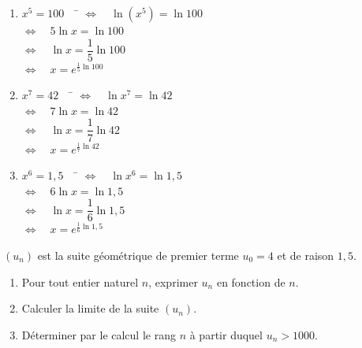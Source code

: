 \documentclass[a4paper,11pt,exos]{nsi} %
\begin{document}
\textcolor{UGLiBlue}{
    \begin{multicols}{2}
        \begin{enumerate}
            \item \begin{tabbing}
                $x^5=100\quad$ \= $\iff \quad \ln\left(x^5\right)=\ln 100$\\
                \> $\iff \quad 5\ln x=\ln 100$\\
                \> $\iff \quad \ln x=\dfrac{1}{5}\ln 100$\\[.5em]
                \> $\iff \quad x=e^{\frac{1}{5}\ln 100}$
            \end{tabbing}
            \item \begin{tabbing}
                $x^7=42\quad$ \= $\iff \quad \ln x^7=\ln 42$\\
                \> $\iff \quad 7\ln x=\ln 42$\\
                \> $\iff \quad \ln x=\dfrac{1}{7}\ln 42$\\[.5em]
                \> $\iff \quad x=e^{\frac{1}{7}\ln 42}$
            \end{tabbing}
            \item \begin{tabbing}
                $x^6=1,5\quad$ \= $\iff \quad \ln x^6=\ln 1,5$\\
                \> $\iff \quad 6\ln x=\ln 1,5$\\
                \> $\iff \quad \ln x=\dfrac{1}{6}\ln 1,5$\\[.5em]
                \> $\iff \quad x=e^{\frac{1}{6}\ln 1,5}$
            \end{tabbing}
        \end{enumerate}
    \end{multicols}
}

\exo{}
$(u_n)$ est la suite géométrique de premier terme $u_0=4$ et de raison $1,5$.
\begin{enumerate}
    \item Pour tout entier naturel $n$, exprimer $u_n$ en fonction de $n$.
    \item Calculer la limite de la suite $(u_n)$.
    \item Déterminer par le calcul le rang $n$ à partir duquel $u_n>1000$.
\end{enumerate}
\end{document}
